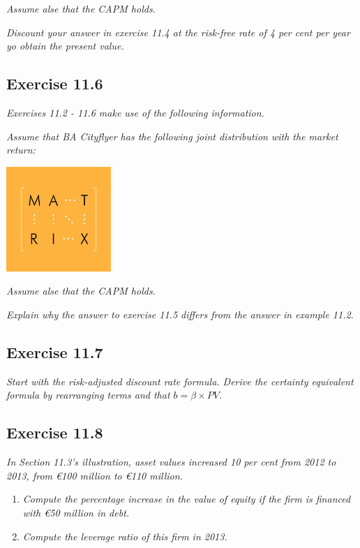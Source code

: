 \documentclass[]{book}
\newcommand{\euro}{€}
\theoremstyle{definition}
\theoremstyle{definition}
\theoremstyle{remark}
\begin{document}
\emph{Assume alse that the CAPM holds.} \citep[p.389]{book}

\emph{Discount your answer in exercise 11.4 at the risk-free rate of 4
per cent per year yo obtain the present value.} \citep[p.389]{book}

\subsection{Exercise 11.6}\label{exercise-11.6}

\emph{Exercises 11.2 - 11.6 make use of the following information.}
\citep[p.389]{book}

\emph{Assume that BA Cityflyer has the following joint distribution with
the market return:} \citep[p.389]{book}

\begin{center}\includegraphics[width=150px]{figures/matrix} \end{center}

\emph{Assume alse that the CAPM holds.} \citep[p.389]{book}

\emph{Explain why the answer to exercise 11.5 differs from the answer in
example 11.2.} \citep[p.389]{book}

\subsection{Exercise 11.7}\label{exercise-11.7}

\emph{Start with the risk-adjusted discount rate formula. Derive the
certainty equivalent formula by rearranging terms and that
\(b=\beta\times PV\).} \citep[p.389]{book}

\subsection{Exercise 11.8}\label{exercise-11.8}

\emph{In Section 11.3's illustration, asset values increased 10 per cent
from 2012 to 2013, from \euro{}100 million to \euro{}110 million.}
\citep[p.389]{book}

\begin{enumerate}
\def\labelenumi{\alph{enumi}.}
\item
  \emph{Compute the percentage increase in the value of equity if the
  firm is financed with \euro{}50 million in debt.} \citep[p.389]{book}
\item
  \emph{Compute the leverage ratio of this firm in 2013.}
  \citep[p.389]{book}
\end{enumerate}
\end{document}
